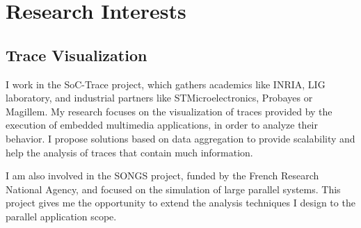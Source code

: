 \section{Research Interests}

\subsection{Trace Visualization}

%
{I work in the SoC-Trace project, which gathers academics like INRIA, LIG 
laboratory, and industrial partners like STMicroelectronics, Probayes or 
Magillem. My research focuses on the visualization of traces provided by 
the execution of embedded multimedia applications, in order to analyze their 
behavior. I propose solutions based on data aggregation to provide scalability 
and help the analysis of traces that contain much information.}

%
{I am also involved in the SONGS project, funded by the French 
Research National Agency, and focused on the simulation of large parallel 
systems. This project gives me the opportunity to extend the analysis 
techniques I design to the parallel application scope.}
